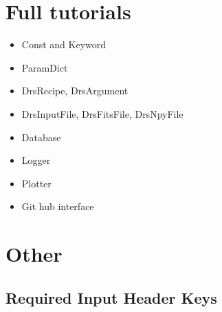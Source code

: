 \documentclass[a4paper,10pt,english]{report}
\begin{document}
\section{Full tutorials}
\label{\detokenize{dev/developer_guide:full-tutorials}}\begin{itemize}
\item {} 
Const and Keyword

\item {} 
ParamDict

\item {} 
DrsRecipe, DrsArgument

\item {} 
DrsInputFile, DrsFitsFile, DrsNpyFile

\item {} 
Database

\item {} 
Logger

\item {} 
Plotter

\item {} 
Git hub interface

\end{itemize}


\section{Other}
\label{\detokenize{dev/developer_guide:other}}

\subsection{Required Input Header Keys}
\label{\detokenize{dev/required_input_header_keys:required-input-header-keys}}\label{\detokenize{dev/required_input_header_keys::doc}}
\end{document}
